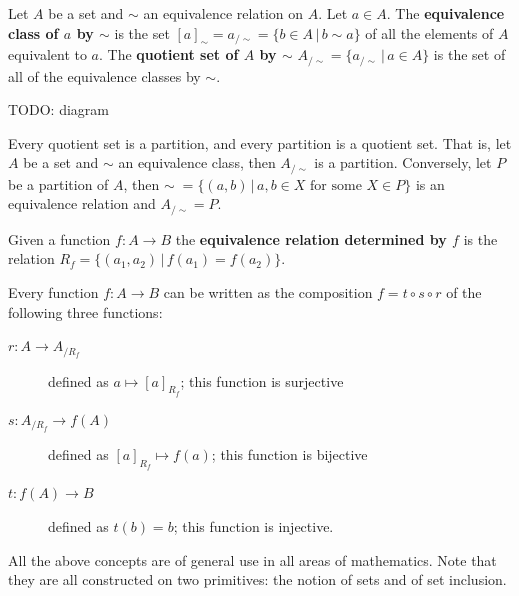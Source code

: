 \documentclass{article}
\newcommand{\marginleft}[1] {\reversemarginpar\marginpar{#1}}
\begin{document}
\begin{defn}
	Let $A$ \marginleft{Eq. classes and quotient set: \\ $[a]_{\sim}, a_{/\sim}, A_{/\sim}$} be a set and $\sim$ an equivalence relation on $A$. Let $a \in A$. The \textbf{equivalence class of $a$ by $\sim$} is the set $[a]_{\sim} = a_{/\sim} = \{b \in A \, | \, b \sim a \}$ of all the elements of $A$ equivalent to $a$. The \textbf{quotient set of $A$ by $\sim$} $A_{/\sim} = \{ a_{/\sim} \, | \, a \in A \}$  is the set of all of the equivalence classes by $\sim$.
\end{defn}

TODO: diagram

\begin{prop}
	Every quotient set is a partition, and every partition is a quotient set. That is, let $A$ be a set and $\sim$ an equivalence class, then $A_{/\sim}$ is a partition. Conversely, let $P$ be a partition of $A$, then $\sim \; = \{ (a,b) \, | \, a, b \in X \text{ for some } X \in P \} $ is an equivalence relation and $A_{/\sim} = P$.
\end{prop}

\begin{defn}
	Given a function $f : A \to B$ the \textbf{equivalence relation determined by $f$} is the relation $R_f = \{ (a_1, a_2) \, | \, f(a_1) = f(a_2) \}$.
\end{defn}

\begin{prop}
	Every function $f : A \to B$ can be written as the composition $f = t \circ s \circ r$ of the following three functions:
	\begin{description}
		\item[$r : A \to A_{/R_f}$] defined as $a \mapsto [a]_{R_f}$; this function is surjective
		\item[$s : A_{/R_f} \to f(A)$] defined as $[a]_{R_f} \mapsto f(a)$; this function is bijective
		\item[$t : f(A) \to B$] defined as $t(b) = b$; this function is injective.
	\end{description}
\end{prop}

\begin{remark}
	All the above concepts are of general use in all areas of mathematics. Note that they are all constructed on two primitives: the notion of sets and of set inclusion.
\end{remark}
\end{document}
